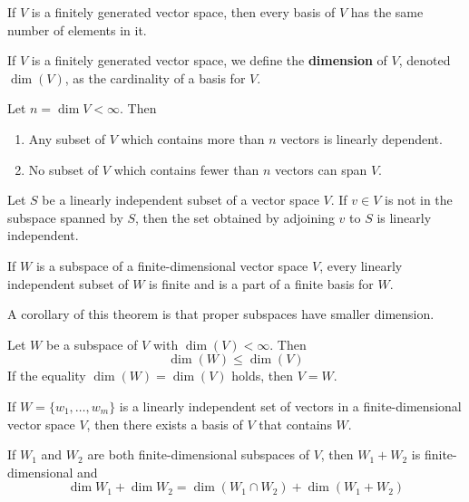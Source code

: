 \begin{theorem}
	If $V$ is a finitely generated vector space, then every basis of $V$ has the same number of elements in it.
\end{theorem}

\begin{definition}[Dimension]
	If $V$ is a finitely generated vector space, we define the \textbf{dimension} of $V$, denoted $\dim(V)$, as the cardinality of a basis for $V$.
\end{definition}

\begin{corollary}
	Let $n = \dim V < \infty$. Then
	\begin{enumerate}
		\item Any subset of $V$ which contains more than $n$ vectors is linearly dependent.
		\item No subset of $V$ which contains fewer than $n$ vectors can span $V$.
	\end{enumerate}
\end{corollary}

\begin{lemma}
	Let $S$ be a linearly independent subset of a vector space $V$. If $v \in V$ is not in the subspace spanned by $S$, then the set obtained by adjoining $v$ to $S$ is linearly independent.
\end{lemma}

\begin{theorem}
	If $W$ is a subspace of a finite-dimensional vector space $V$, every linearly independent subset of $W$ is finite and is a part of a finite basis for $W$.
\end{theorem}

A corollary of this theorem is that proper subspaces have smaller dimension.

\begin{corollary}
	Let $W$ be a subspace of $V$ with $\dim(V) < \infty$. Then \[ \dim(W) \leq \dim(V) \] If the equality $\dim(W) = \dim(V)$ holds, then $V = W$.
\end{corollary}

\begin{corollary}
	If $W = \{ w_1, \ldots, w_m \}$ is a linearly independent set of vectors in a finite-dimensional vector space $V$, then there exists a basis of $V$ that contains $W$.
\end{corollary}

\begin{theorem}
	If $W_1$ and $W_2$ are both finite-dimensional subspaces of $V$, then $W_1 + W_2$ is finite-dimensional and 
	\[
	    \dim W_1 + \dim W_2 = \dim (W_1 \cap W_2) + \dim (W_1 + W_2)
	\]
\end{theorem}

